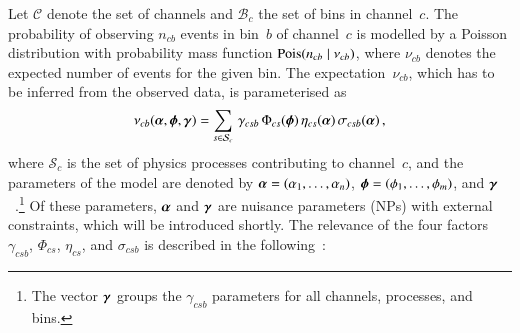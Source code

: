 Let $\mathcal{C}$ denote the set of channels and $\mathcal{B}_{c}$ the set of
bins in channel~$c$. The probability of observing $n_{cb}$ events in bin~$b$ of
channel~$c$ is modelled by a Poisson distribution with probability mass function
$\operatorname{Pois}(n_{cb} \mid \nu_{cb})$, where $\nu_{cb}$ denotes the expected number of
events for the given bin. The expectation~$\nu_{cb}$, which has to be inferred
from the observed data, is parameterised as
\begin{align*}
  \nu_{cb}(\myvec{\alpha}, \myvec{\phi}, \myvec{\gamma}) =
  \sum_{s \in \mathcal{S}_{c}} \, \gamma_{csb} \, \Phi_{cs}(\myvec{\phi}) \, \eta_{cs}(\myvec{\alpha}) \, \sigma_{csb}(\myvec{\alpha}) \,\text{,}
\end{align*}
where $\mathcal{S}_{c}$ is the set of physics processes contributing to
channel~$c$, and the parameters of the model are denoted by
${\myvec{\alpha} = (\alpha_1, \dots, \alpha_n)}$,
${\myvec{\phi} = (\phi_1, \dots, \phi_m)}$, and
$\myvec{\gamma}$~\cite{cranmer2012}.\footnote{The vector $\myvec{\gamma}$ groups
  the $\gamma_{csb}$ parameters for all channels, processes, and bins.} Of these
parameters, $\myvec{\alpha}$ and $\myvec{\gamma}$ are nuisance parameters (NPs)
with external constraints, which will be introduced shortly.  The relevance of
the four factors $\gamma_{csb}$, $\Phi_{cs}$, $\eta_{cs}$, and $\sigma_{csb}$ is
described in the following~\cite{cranmer2012}:
